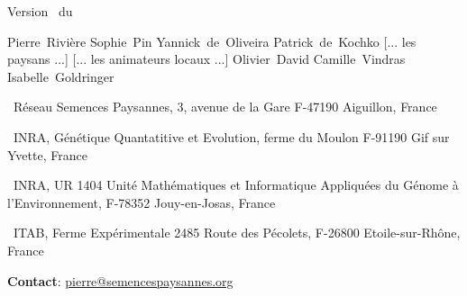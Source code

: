 


\graphicspath{{../ressources/figures/}}

%
%
%
%
%
%
%
%
%



\pagestyle{empty}

\begin{center}


\vfill

\large
Version \versionCF~du \dateversionCF

\vfill

\normalsize

Pierre~Rivière \hspace{.5cm}
Sophie~Pin \hspace{.5cm}
Yannick~de~Oliveira \hspace{.5cm}
Patrick~de~Kochko \hspace{.5cm}
[... les paysans ...] \hspace{.5cm}
[... les animateurs locaux ...] \hspace{.5cm}
Olivier~David \hspace{.5cm}
Camille~Vindras \hspace{.5cm}
Isabelle~Goldringer \\
\end{center}

\small
\noindent{}~Réseau Semences Paysannes, 3, avenue de la Gare F-47190 Aiguillon, France 

\noindent{}~INRA, Génétique Quantatitive et Evolution, ferme du Moulon F-91190 Gif sur Yvette, France

\noindent{}~INRA, UR 1404 Unité Mathématiques et Informatique Appliquées du Génome à l'Environnement, F-78352 Jouy-en-Josas, France

\noindent{}~ITAB, Ferme Expérimentale 2485 Route des Pécolets, F-26800 Etoile-sur-Rhône, France

\noindent\up{*} \textbf{Contact}: \href{mailto:pierre@semencespaysannes.org}{\textcolor{mln-green} {pierre@semencespaysannes.org}}

